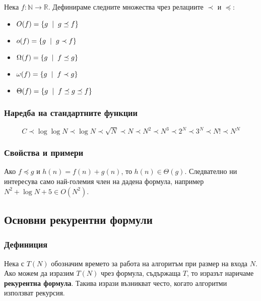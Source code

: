 \documentclass[fleqn,12pt]{article}
\begin{document}
Нека $f : \mathbb{N} \rightarrow \mathbb{R}$. Дефинираме следните множества чрез релациите $\prec$ и $\preceq$:
\begin{itemize}
    \item $O(f) = \{g \hspace{2mm} | \hspace{2mm} g \preceq f\}$
    \item $o(f) = \{g \hspace{2mm} | \hspace{2mm} g \prec f\}$
    \item $\Omega(f) = \{g \hspace{2mm} | \hspace{2mm} f \preceq g\}$
    \item $\omega(f) = \{g \hspace{2mm} | \hspace{2mm} f \prec g\}$
    \item $\Theta(f) = \{g \hspace{2mm} | \hspace{2mm} f \preceq g \preceq f\}$
\end{itemize}

\subsubsection{Наредба на стандартните функции}
\noindent\[ C \prec \log \log N \prec \log N \prec \sqrt{N} \prec N \prec N^2 \prec N^3 \prec 2^N \prec 3^N \prec N! \prec N^N \]

\subsubsection{Свойства и примери}
Ако $f \preceq g$ и $h(n) = f(n) + g(n)$, то $h(n) \in \Theta(g)$.
Следвателно ни интересува само най-големия член на дадена формула, например
$N^2 + \log N + 5 \in O(N^2)$.

\subsection{Основни рекурентни формули}
\subsubsection{Дефиниция}
Нека с $T(N)$ обозначим времето за работа на алгоритъм при размер на входа $N$.
Ако можем да изразим $T(N)$ чрез формула, съдържаща $T$, то изразът наричаме \textbf{рекурентна формула}.
Такива изрази възникват често, когато алгоритми използват рекурсия.
\end{document}
